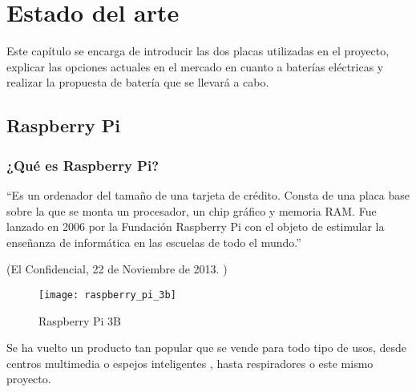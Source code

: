 
\chapter{Estado del arte} %
\label{sec:EstadoDelArte}

    Este capítulo se encarga de introducir las dos placas utilizadas en el proyecto, explicar las opciones actuales en
    el mercado en cuanto a baterías eléctricas y realizar la propuesta de batería que se llevará a cabo.

    \section{Raspberry Pi} %
    \label{sec:RaspberryPi}

        \subsection{¿Qué es Raspberry Pi?} %
        \label{sub:QueEsRaspberryPi}

            ``Es un ordenador del tamaño de una tarjeta de crédito. Consta de una placa base sobre la que se monta un
            procesador, un chip gráfico y memoria RAM. Fue lanzado en 2006 por la Fundación Raspberry Pi con el objeto
            de estimular la enseñanza de informática en las escuelas de todo el mundo.''

            \begin{flushright}
                (El Confidencial, 22 de Noviembre de 2013. \cite{confidencial_raspberry})
            \end{flushright}

            \begin{figure}[ht]
                \centering
                \texttt{[image: raspberry\_pi\_3b]}
                \caption{Raspberry Pi 3B \cite{imagen_raspberry_pi_3b}\label{fig:ImagenRaspberryPi3B}}
            \end{figure}

            Se ha vuelto un producto tan popular que se vende para todo tipo de usos, desde centros
            multimedia \cite{centro_multimedia_raspberry_pi} o espejos inteligentes \cite{espejo_raspberry_pi}, hasta
            respiradores \cite{github_respirador} o este mismo proyecto.

